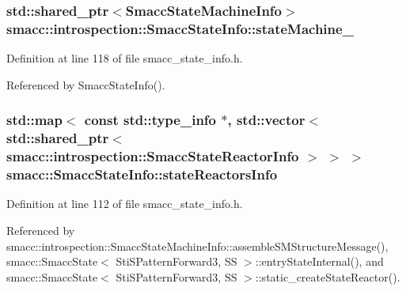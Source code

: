 \subsubsection[{\texorpdfstring{state\+Machine\+\_\+}{stateMachine_}}]{\setlength{\rightskip}{0pt plus 5cm}std\+::shared\+\_\+ptr$<${\bf Smacc\+State\+Machine\+Info}$>$ smacc\+::introspection\+::\+Smacc\+State\+Info\+::state\+Machine\+\_\+}\hypertarget{classsmacc_1_1introspection_1_1SmaccStateInfo_a74685e4540842ee292a80a1db44818bb}{}\label{classsmacc_1_1introspection_1_1SmaccStateInfo_a74685e4540842ee292a80a1db44818bb}


Definition at line 118 of file smacc\+\_\+state\+\_\+info.\+h.



Referenced by Smacc\+State\+Info().

\subsubsection[{\texorpdfstring{state\+Reactors\+Info}{stateReactorsInfo}}]{\setlength{\rightskip}{0pt plus 5cm}std\+::map$<$ const std\+::type\+\_\+info $\ast$, std\+::vector$<$ std\+::shared\+\_\+ptr$<$ {\bf smacc\+::introspection\+::\+Smacc\+State\+Reactor\+Info} $>$ $>$ $>$ smacc\+::\+Smacc\+State\+Info\+::state\+Reactors\+Info\hspace{0.3cm}{\ttfamily [static]}}\hypertarget{classsmacc_1_1introspection_1_1SmaccStateInfo_abd1d6ca5060c87f6bd11fde3e5b2ac4d}{}\label{classsmacc_1_1introspection_1_1SmaccStateInfo_abd1d6ca5060c87f6bd11fde3e5b2ac4d}


Definition at line 112 of file smacc\+\_\+state\+\_\+info.\+h.



Referenced by smacc\+::introspection\+::\+Smacc\+State\+Machine\+Info\+::assemble\+S\+M\+Structure\+Message(), smacc\+::\+Smacc\+State$<$ Sti\+S\+Pattern\+Forward3, S\+S $>$\+::entry\+State\+Internal(), and smacc\+::\+Smacc\+State$<$ Sti\+S\+Pattern\+Forward3, S\+S $>$\+::static\+\_\+create\+State\+Reactor().

